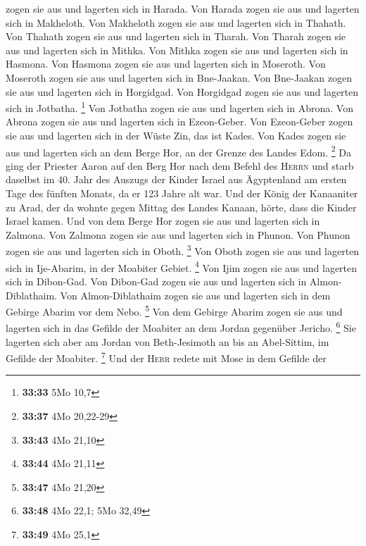 zogen sie aus und lagerten sich in Harada.  Von Harada
zogen sie aus und lagerten sich in Makheloth.  Von
Makheloth zogen sie aus und lagerten sich in Thahath. 
Von Thahath zogen sie aus und lagerten sich in Tharah. 
Von Tharah zogen sie aus und lagerten sich in Mithka. 
Von Mithka zogen sie aus und lagerten sich in Hasmona. 
Von Hasmona zogen sie aus und lagerten sich in Moseroth. 
Von Moseroth zogen sie aus und lagerten sich in Bne-Jaakan.
 Von Bne-Jaakan zogen sie aus und lagerten sich in
Horgidgad.  Von Horgidgad zogen sie aus und lagerten sich
in Jotbatha. \footnote{\textbf{33:33} 5Mo 10,7}  Von
Jotbatha zogen sie aus und lagerten sich in Abrona.  Von
Abrona zogen sie aus und lagerten sich in Ezeon-Geber. 
Von Ezeon-Geber zogen sie aus und lagerten sich in der Wüste Zin, das
ist Kades.  Von Kades zogen sie aus und lagerten sich an
dem Berge Hor, an der Grenze des Landes Edom. \footnote{\textbf{33:37}
  4Mo 20,22-29}  Da ging der Priester Aaron auf den Berg
Hor nach dem Befehl des \textsc{Herrn} und starb daselbst im 40. Jahr
des Auszugs der Kinder Israel aus Ägyptenland am ersten Tage des fünften
Monats,  da er 123 Jahre alt war.  Und der
König der Kanaaniter zu Arad, der da wohnte gegen Mittag des Landes
Kanaan, hörte, dass die Kinder Israel kamen.  Und von dem
Berge Hor zogen sie aus und lagerten sich in Zalmona. 
Von Zalmona zogen sie aus und lagerten sich in Phunon. 
Von Phunon zogen sie aus und lagerten sich in Oboth. \footnote{\textbf{33:43}
  4Mo 21,10}  Von Oboth zogen sie aus und lagerten sich
in Ije-Abarim, in der Moabiter Gebiet. \footnote{\textbf{33:44} 4Mo
  21,11}  Von Ijim zogen sie aus und lagerten sich in
Dibon-Gad.  Von Dibon-Gad zogen sie aus und lagerten sich
in Almon-Diblathaim.  Von Almon-Diblathaim zogen sie aus
und lagerten sich in dem Gebirge Abarim vor dem Nebo. \footnote{\textbf{33:47}
  4Mo 21,20}  Von dem Gebirge Abarim zogen sie aus und
lagerten sich in das Gefilde der Moabiter an dem Jordan gegenüber
Jericho. \footnote{\textbf{33:48} 4Mo 22,1; 5Mo 32,49} 
Sie lagerten sich aber am Jordan von Beth-Jesimoth an bis an
Abel-Sittim, im Gefilde der Moabiter. \footnote{\textbf{33:49} 4Mo 25,1}
 Und der \textsc{Herr} redete mit Mose in dem Gefilde der
